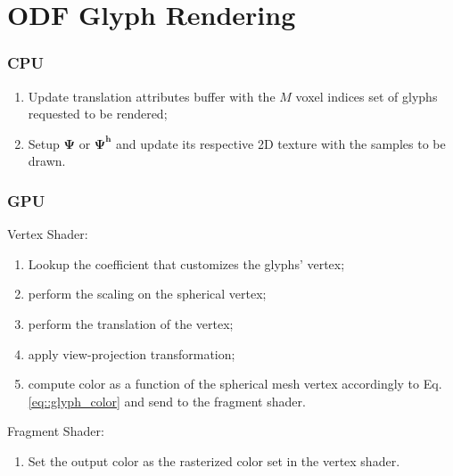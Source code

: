 \documentclass[twoside,twocolumn,10pt]{article}
\begin{document}
\section{ODF Glyph Rendering}
\label{sec::odf_glyph_rendering}



\label{ssec::rendering}
\subsubsection{CPU}
\begin{enumerate}
    \item Update translation attributes buffer with the $M$ voxel indices set of glyphs requested to be rendered;
    \item Setup $\bm{\Psi}$ or $\bm{\Psi^h}$ and update its respective 2D texture with the samples to be drawn.
\end{enumerate}

\subsubsection{GPU}
Vertex Shader:
\begin{enumerate}
    \item Lookup the coefficient that customizes the glyphs' vertex; 
    \item perform the scaling on the spherical vertex;
    \item perform the translation of the vertex;
    \item apply view-projection transformation;
    \item compute color as a function of the spherical mesh vertex accordingly to Eq. \ref{eq::glyph_color} and send to the fragment shader.
\end{enumerate}

Fragment Shader:
\begin{enumerate}
    \item Set the output color as the rasterized color set in the vertex shader.
\end{enumerate}
\end{document}
